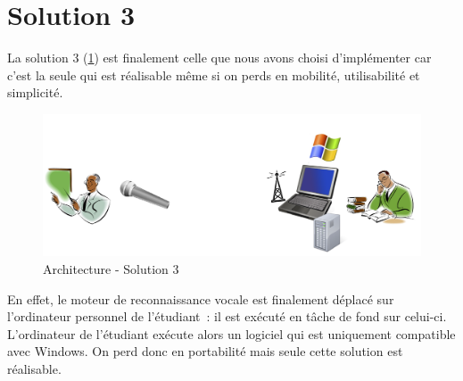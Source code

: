 \section{Solution 3}
La solution 3 (\ref{fig:solution3}) est finalement celle que nous avons choisi d'implémenter car c'est la seule qui est réalisable même si on perds en mobilité, utilisabilité et simplicité.


\begin{figure}[h]
 \centering
 \includegraphics[scale=0.5]{./img/solution3.png}
 \caption{Architecture - Solution 3}
 \label{fig:solution3}
\end{figure}


En effet, le moteur de reconnaissance vocale est finalement déplacé sur l'ordinateur personnel de l'étudiant~: il est exécuté en tâche de fond sur celui-ci. L'ordinateur de l'étudiant exécute alors un logiciel qui est uniquement compatible avec Windows. On perd donc en portabilité mais seule cette solution est réalisable.

